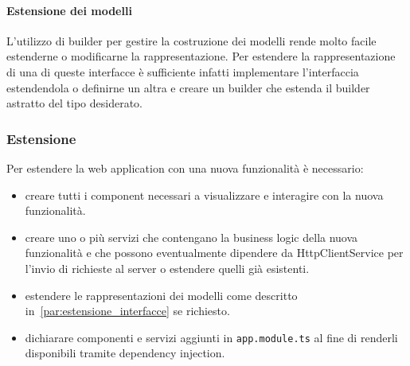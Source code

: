 \documentclass[../../manuale-manutentore.tex]{subfiles}
\begin{document}
\paragraph{Estensione dei modelli}%
\label{par:estensione_interfacce_webapp}

L'utilizzo di builder per gestire la costruzione dei modelli rende molto facile estenderne o modificarne la rappresentazione.
Per estendere la rappresentazione di una di queste interfacce è sufficiente infatti implementare l'interfaccia estendendola o definirne un altra e creare un builder che estenda il builder astratto del tipo desiderato.



\subsubsection{Estensione}%
\label{subs:estensione_webapp}

Per estendere la web application con una nuova funzionalità è necessario:

\begin{itemize}
  \item creare tutti i component necessari a visualizzare e interagire con la nuova funzionalità.
  \item creare uno o più servizi che contengano la business logic della nuova funzionalità e che possono eventualmente dipendere da HttpClientService per l'invio di richieste al server o estendere quelli già esistenti.
  \item estendere le rappresentazioni dei modelli come descritto in~\ref{par:estensione_interfacce} se richiesto.
  \item dichiarare componenti e servizi aggiunti in \texttt{app.module.ts} al fine di renderli disponibili tramite dependency injection.
\end{itemize}
\end{document}
